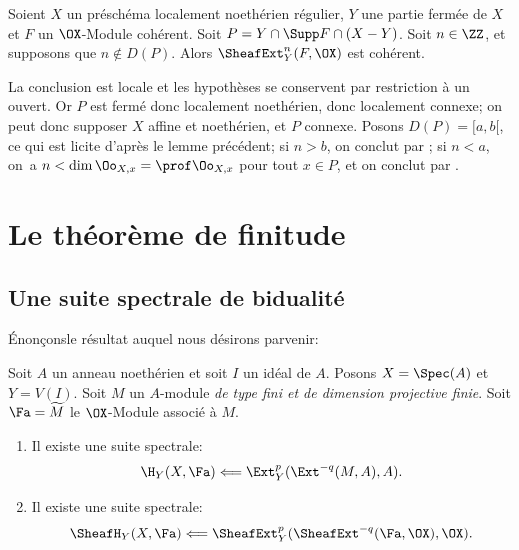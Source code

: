 \begin{proposition}\label{VII.2.3} Soient $X$ un pr\'esch\'ema localement noeth\'erien r\'egulier, $Y$ une partie ferm\'ee de $X$ et $F$ un $\OX$-Module coh\'erent. Soit $P = Y \cap \Supp F \cap (X - Y)$. Soit $n \in \ZZ$, et supposons que $n \not\in D(P)$. Alors $\SheafExt^n_Y (F, \OX)$ est coh\'erent.
\end{proposition}

La conclusion est locale et les hypoth\`eses se conservent par restriction \`a un ouvert. Or $P$ est ferm\'e donc localement noeth\'erien, donc localement connexe; on peut donc supposer $X$ affine et noeth\'erien, et $P$ connexe. Posons $D(P) = [a, b[$, ce qui est licite d'apr\`es le lemme pr\'ec\'edent; si $n> b$, on conclut par ; si $n < a$, on~a \hbox{$n < \dim \Oo_{X, x} = \prof \Oo_{X, x}$} pour tout $x \in P$, et on conclut par .

\chapter{Le th\'eor\`eme de finitude} \label{VIII}

\section[Une suite spectrale de bidualit\'e]
{Une suite spectrale de bidualit\'e\protect\sfootnotemark}\label{VIII.1}

\renewcommand{\theequation}{\thesection.\arabic{equation}}

\'Enon\c cons\pageoriginale le r\'esultat auquel nous d\'esirons parvenir:

\begin{proposition} \label{VIII.1.1} Soit $A$ un anneau noeth\'erien et soit $I$ un id\'eal de $A$. Posons $X=\Spec(A)$ et $Y=V(I)$. Soit $M$ un $A$-module \emph{de type fini et de dimension projective finie}. Soit ${\Fa}=\widetilde{M}$ le $\OX$-Module associ\'e \`a $M$.
\begin{enumerate}
\item[\textup{1)}] Il existe une suite spectrale:
\[
\H_Y(X, {\Fa}) \Longleftarrow \Ext^p_Y(\Ext^{-q}(M, A), A).
\]

\item[\textup{2)}] Il existe une suite spectrale:
\[
\SheafH_Y(X, {\Fa}) \Longleftarrow \SheafExt^p_Y(\SheafExt^{-q}({\Fa}, \OX), \OX).
\]
\end{enumerate}
\end{proposition}

